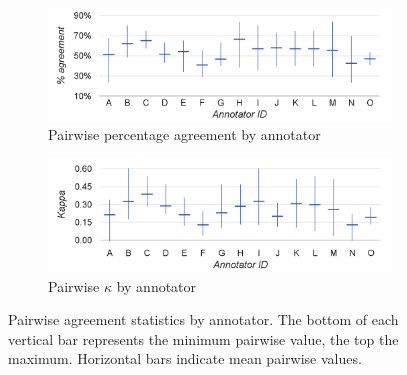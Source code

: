 		\begin{figure}[p]
			\centering
			
			\begin{subfigure}{\textwidth}
				\centering
				\includegraphics[width=\textwidth]{img/annotation/pairAgreeAnnotators-noTitle}
				\caption{Pairwise percentage agreement by annotator}
				\label{fig:agreement:annotators:pct}
			\end{subfigure}%

			\vspace{1em}			
			
			\begin{subfigure}{\textwidth}
				\centering
				\includegraphics[width=\textwidth]{img/annotation/pairKappaAnnotators-noTitle}
				\caption{Pairwise $\kappa$ by annotator}
				\label{fig:agreement:annotators:k}
			\end{subfigure}%
			
			\vspace{1em}			
			
			\caption[Pairwise agreement statistics by annotator]{Pairwise agreement statistics by annotator. The bottom of each vertical bar represents the minimum pairwise value, the top the maximum. Horizontal bars indicate mean pairwise values.}
			\label{fig:agreement:annotators}
		\end{figure}
		
